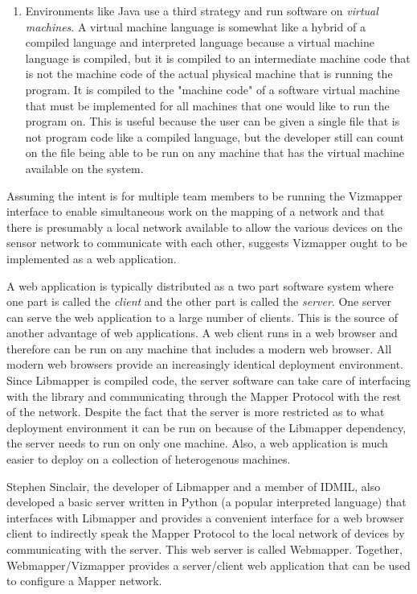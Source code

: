 \begin{enumerate}
\item Environments like Java use a third strategy and run software on \emph{virtual machines}. A virtual machine language is somewhat like a hybrid of a compiled language and interpreted language because a virtual machine language is compiled, but it is compiled to an intermediate machine code that is not the machine code of the actual physical machine that is running the program. It is compiled to the "machine code" of a software virtual machine that must be implemented for all machines that one would like to run the program on. This is useful because the user can be given a single file that is not program code like a compiled language, but the developer still can count on the file being able to be run on any machine that has the virtual machine available on the system.
\end{enumerate}

Assuming the intent is for multiple team members to be running the Vizmapper interface to enable simultaneous work on the mapping of a network and that there is presumably a local network available to allow the various devices on the sensor network to communicate with each other, suggests Vizmapper ought to be implemented as a web application. 

A web application is typically distributed as a two part software system where one part is called the \emph{client} and the other part is called the \emph{server}. One server can serve the web application to a large number of clients. This is the source of another advantage of web applications. A web client runs in a web browser and therefore can be run on any machine that includes a modern web browser. All modern web browsers provide an increasingly identical deployment environment. Since Libmapper is compiled code, the server software can take care of interfacing with the library and communicating through the Mapper Protocol with the rest of the network. Despite the fact that the server is more restricted as to what deployment environment it can be run on because of the Libmapper dependency, the server needs to run on only one machine. Also, a web application is much easier to deploy on a collection of heterogenous machines.

Stephen Sinclair, the developer of Libmapper and a member of IDMIL, also developed a basic server written in Python (a popular interpreted language) that interfaces with Libmapper and provides a convenient interface for a web browser client to indirectly speak the Mapper Protocol to the local network of devices by communicating with the server. This web server is called Webmapper. Together, Webmapper/Vizmapper provides a server/client web application that can be used to configure a Mapper network.

